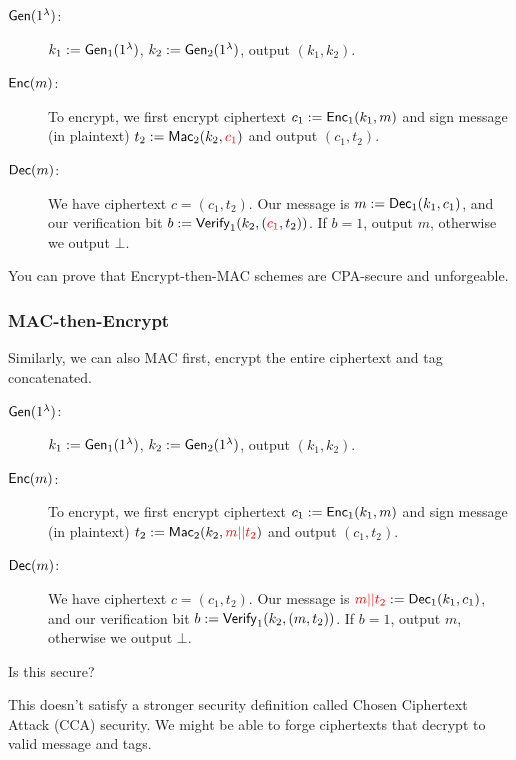 
\begin{description}
    \item[$\operatorname{\mathsf{Gen}}(1^\lambda)$:] $k_1:=\operatorname{\mathsf{Gen}}_1(1^\lambda)$, $k_2:=\operatorname{\mathsf{Gen}}_2(1^\lambda)$, output $(k_1, k_2)$.

    \item[$\operatorname{\mathsf{Enc}}(m)$:] To encrypt, we first encrypt ciphertext $c_1 := \operatorname{\mathsf{Enc}}_1(k_1, m)$ and sign message (in plaintext) $t_2 := \operatorname{\mathsf{Mac}}_2(k_2, {\color{red} c_1})$ and output $(c_1, t_2)$.

    \item[$\operatorname{\mathsf{Dec}}(m)$:] We have ciphertext $c = (c_1, t_2)$. Our message is $m:=\operatorname{\mathsf{Dec}}_1(k_1, c_1)$, and our verification bit $b := \operatorname{\mathsf{Verify}}_1(k_2, ({\color{red} c_1}, t_2))$. If $b = 1$, output $m$, otherwise we output $\bot$.
\end{description}

You can prove that Encrypt-then-MAC schemes are CPA-secure and unforgeable.

\subsubsection{MAC-then-Encrypt}
Similarly, we can also MAC first, encrypt the entire ciphertext and tag concatenated.


\begin{description}
    \item[$\operatorname{\mathsf{Gen}}(1^\lambda)$:] $k_1:=\operatorname{\mathsf{Gen}}_1(1^\lambda)$, $k_2:=\operatorname{\mathsf{Gen}}_2(1^\lambda)$, output $(k_1, k_2)$.

    \item[$\operatorname{\mathsf{Enc}}(m)$:] To encrypt, we first encrypt ciphertext $c_1 := \operatorname{\mathsf{Enc}}_1(k_1, m)$ and sign message (in plaintext) $t_2 := \operatorname{\mathsf{Mac}}_2(k_2, {\color{red} m||t_2})$ and output $(c_1, t_2)$.

    \item[$\operatorname{\mathsf{Dec}}(m)$:] We have ciphertext $c = (c_1, t_2)$. Our message is ${\color{red} m||t_2}:=\operatorname{\mathsf{Dec}}_1(k_1, c_1)$, and our verification bit $b := \operatorname{\mathsf{Verify}}_1(k_2, (m, t_2))$. If $b = 1$, output $m$, otherwise we output $\bot$.
\end{description}

\begin{ques*}
    Is this secure?
\end{ques*}

This doesn't satisfy a stronger security definition called Chosen Ciphertext Attack (CCA) security. We might be able to forge ciphertexts that decrypt to valid message and tags.


